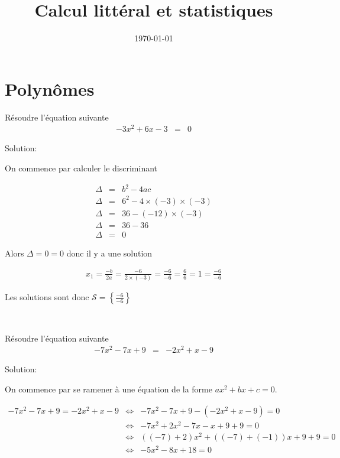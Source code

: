 \documentclass[a4paper,10pt]{article}
\title{Calcul littéral et statistiques}
\date{\today}
\begin{document}
\maketitle


\section{Polynômes}



    Résoudre l'équation suivante
    \begin{eqnarray*}
        - 3 x^{  2 } + 6 x - 3 & = & 0
    \end{eqnarray*}

    Solution:

    On commence par calculer le discriminant
    
    \begin{eqnarray*}
        \Delta & = & b^2-4ac \\
        \Delta & = & 6^{  2 } - 4 \times ( -3 ) \times ( -3 ) \\ 
\Delta & = & 36 - ( -12 ) \times ( -3 ) \\ 
\Delta & = & 36 - 36 \\ 
\Delta & = & 0
    \end{eqnarray*}
    

    
    Alors $\Delta = 0 = 0$ donc il y a une solution

    

    \begin{eqnarray*}
        x_1 = \frac{-b}{2a} = \frac{ -6 }{ 2 \times ( -3 ) } = \frac{ -6 }{ -6 } = \frac{ 6 }{ 6 } = 1 = \frac{ -6 }{ -6 }
    \end{eqnarray*}

    Les solutions sont donc $\mathcal{S} = \left\{ \frac{ -6 }{ -6 }\right\}$

    

    \bigskip
    ~\dotfill
    \bigskip
    
    
    
    
    Résoudre l'équation suivante
    \begin{eqnarray*}
        - 7 x^{  2 } - 7 x + 9 & = & - 2 x^{  2 } + x - 9
    \end{eqnarray*}

    Solution:

    On commence par se ramener à une équation de la forme $ax^2+bx+c = 0$.

    \begin{eqnarray*}
        - 7 x^{  2 } - 7 x + 9 = - 2 x^{  2 } + x - 9 & \Leftrightarrow & - 7 x^{  2 } - 7 x + 9 - (- 2 x^{  2 } + x - 9) = 0 \\
         & \Leftrightarrow & - 7 x^{  2 } + 2 x^{  2 } - 7 x - x + 9 + 9= 0 \\ 
 & \Leftrightarrow & ( ( -7 ) + 2 ) x^{  2 } + ( ( -7 ) + ( -1 ) ) x + 9 + 9= 0 \\ 
 & \Leftrightarrow & - 5 x^{  2 } - 8 x + 18= 0
    \end{eqnarray*}
\end{document}
